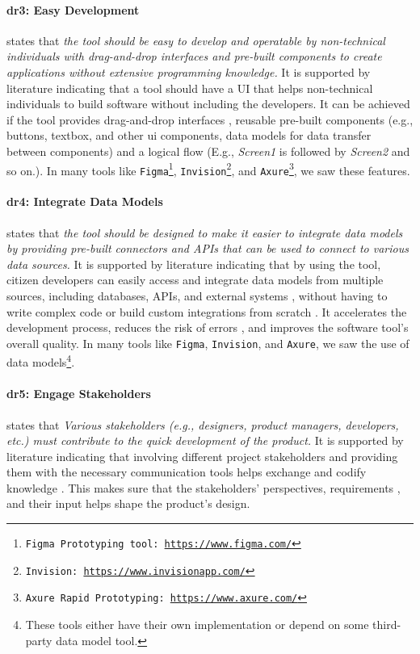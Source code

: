 \paragraph{\ac{dr}3: Easy Development} states that \textit{the tool should be easy to develop and operatable by non-technical individuals with drag-and-drop interfaces and pre-built components to create applications without extensive programming knowledge.} 
It is supported by literature indicating that a tool should have a UI that helps non-technical individuals to build software without including the developers. 
It can be achieved if the tool provides drag-and-drop interfaces \cite{article:nocode:miller}, reusable pre-built components \cite{article:prototyping:lowcode} (e.g., buttons, textbox, and other \ac{ui} components, data models for data transfer between components) and a logical flow (E.g., \textit{Screen1} is followed by \textit{Screen2} and so on.). 
In many tools like \texttt{Figma\footnote{Figma Prototyping tool: \url{https://www.figma.com/}}}, \texttt{Invision\footnote{Invision: \url{https://www.invisionapp.com/}}}, and \texttt{Axure\footnote{Axure Rapid Prototyping: \url{https://www.axure.com/}}}, we saw these features.

\paragraph{\ac{dr}4: Integrate Data Models} states that \textit{the tool should be designed to make it easier to integrate data models by providing pre-built connectors and APIs that can be used to connect to various data sources.} 
It is supported by literature indicating that by using the tool, citizen developers can easily access and integrate data models from multiple sources, including databases, APIs, and external systems \cite{paper:lowcode:khorram}, without having to write complex code or build custom integrations from scratch \cite{article:lowcode:modeldriven}.
It accelerates the development process, reduces the risk of errors \cite{misc:lowcode:platforms}, and improves the software tool's overall quality.
In many tools like \texttt{Figma}, \texttt{Invision}, and \texttt{Axure}, we saw the use of data models\footnote{These tools either have their own implementation or depend on some third-party data model tool.}.

\paragraph{\ac{dr}5: Engage Stakeholders} states that \textit{Various stakeholders (e.g., designers, product managers, developers, etc.) must contribute to the quick development of the product.}
It is supported by literature indicating that involving different project stakeholders and providing them with the necessary communication tools helps exchange and codify knowledge \cite{article:prototyping:weichbroth}. 
This makes sure that the stakeholders' perspectives, requirements \cite{misc:prorotypes:lauff}, and their input helps shape the product's design.

